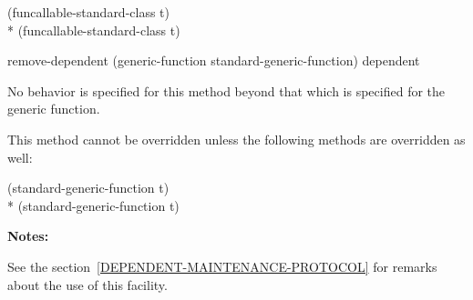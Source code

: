 \begin{defun}
\begin{defun}
\begin{tabbing}
     (funcallable-standard-class t)\\*
     (funcallable-standard-class t) 
\end{tabbing}
\end{defun}

\begin{defun}
remove-dependent (generic-function standard-generic-function) dependent

No behavior is specified for this method beyond that which is specified for the generic function.

This method cannot be overridden unless the following methods are overridden as well:

\begin{tabbing}
     (standard-generic-function t)\\*
     (standard-generic-function t) 
\end{tabbing}
\end{defun}

\textbf{Notes:}

See the section~\ref{DEPENDENT-MAINTENANCE-PROTOCOL} for remarks about the use
of this facility.
\end{defun}

